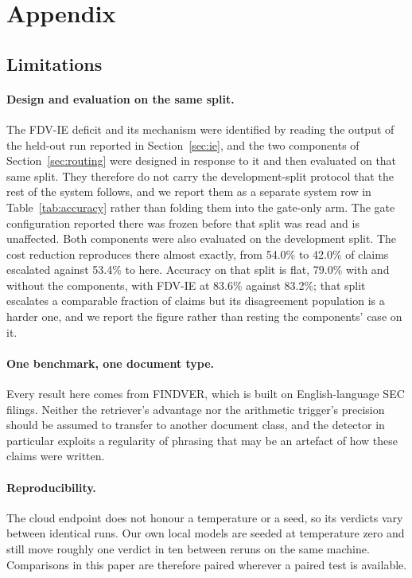 \documentclass{article}
\begin{document}
\appendix

\section{Appendix}

\subsection{Limitations}
\label{sec:limitations}

\paragraph{Design and evaluation on the same split.}
The FDV-IE deficit and its mechanism were identified by reading the output of the held-out
run reported in Section~\ref{sec:ie}, and the two components of Section~\ref{sec:routing}
were designed in response to it and then evaluated on that same split. They therefore do not
carry the development-split protocol that the rest of the system follows, and we report them
as a separate system row in Table~\ref{tab:accuracy} rather than folding them into the
gate-only arm. The gate configuration reported there was frozen before that split was read
and is unaffected. Both components were also evaluated on the development split. The
cost reduction reproduces there almost exactly, from 54.0\% to 42.0\% of claims escalated
against 53.4\% to \fullEscRate{} here. Accuracy on that split is flat, 79.0\% with and
without the components, with FDV-IE at 83.6\% against 83.2\%; that split escalates a
comparable fraction of claims but its disagreement population is a harder one, and we report
the figure rather than resting the components' case on it.

\paragraph{One benchmark, one document type.}
Every result here comes from FINDVER, which is built on English-language SEC filings.
Neither the retriever's advantage nor the arithmetic trigger's precision should be assumed
to transfer to another document class, and the detector in particular exploits a
regularity of phrasing that may be an artefact of how these claims were written.

\paragraph{Reproducibility.}
The cloud endpoint does not honour a temperature or a seed, so its verdicts vary between
identical runs. Our own local models are seeded at temperature zero and still move roughly
one verdict in ten between reruns on the same machine. Comparisons in this paper are
therefore paired wherever a paired test is available.
\end{document}
